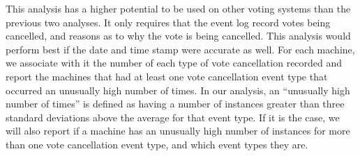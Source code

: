 This analysis has a higher potential to be used on other voting systems than the
previous two analyses.  It only requires that the event log record
votes being cancelled, and reasons as to why the vote is being cancelled.  This
analysis would perform best if the date and time stamp were accurate as well.
For each machine, we associate with it the number of each type of vote
cancellation recorded and report the
machines that had at least one vote cancellation event type that occurred an
unusually high number of times. In our analysis, an \textquotedblleft unusually
high number of times\textquotedblright \hspace{1 mm} is defined as having a
number of instances greater than three standard deviations above the average for
that event type.
If it is the case, we will also report if a machine has an unusually high
number of instances for more than one vote cancellation event type, and which
event types they are.  


